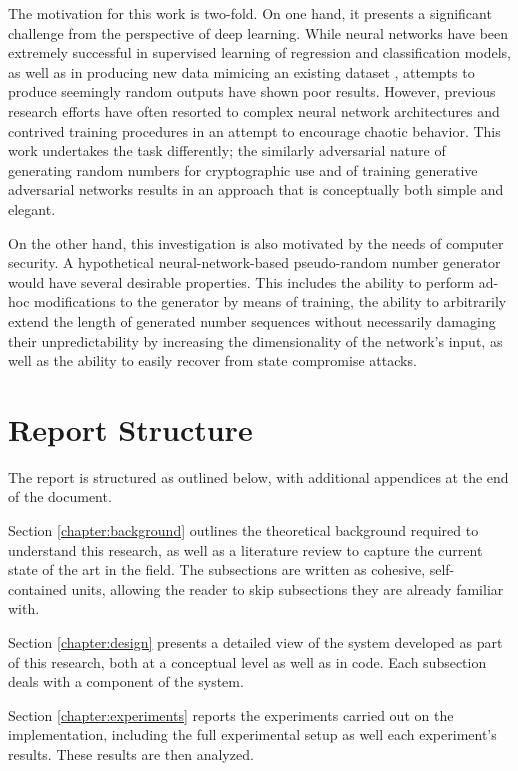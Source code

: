 \documentclass[12pt, titlepage]{report}
\theoremstyle{definition}
\begin{document}
The motivation for this work is two-fold. On one hand, it presents a significant challenge from the perspective of deep learning. While neural networks have been extremely successful in supervised learning of regression and classification models, as well as in producing new data mimicing an existing dataset \cite{goodfellow2014generative}, attempts to produce seemingly random outputs have shown poor results. However, previous research efforts have often resorted to complex neural network architectures and contrived training procedures in an attempt to encourage chaotic behavior. This work undertakes the task differently; the similarly adversarial nature of generating random numbers for cryptographic use and of training generative adversarial networks results in an approach that is conceptually both simple and elegant.

On the other hand, this investigation is also motivated by the needs of computer security. A hypothetical neural-network-based pseudo-random number generator would have several desirable properties. This includes the ability to perform ad-hoc modifications to the generator by means of training, the ability to arbitrarily extend the length of generated number sequences without necessarily damaging their unpredictability by increasing the dimensionality of the network's input, as well as the ability to easily recover from state compromise attacks.


\section{Report Structure}
The report is structured as outlined below, with additional appendices at the end of the document.

Section \ref{chapter:background} outlines the theoretical background required to understand this research, as well as a literature review to capture the current state of the art in the field. The subsections are written as cohesive, self-contained units, allowing the reader to skip subsections they are already familiar with.

Section \ref{chapter:design} presents a detailed view of the system developed as part of this research, both at a conceptual level as well as in code. Each subsection deals with a component of the system.

Section \ref{chapter:experiments} reports the experiments carried out on the implementation, including the full experimental setup as well each experiment's results. These results are then analyzed.
\end{document}
